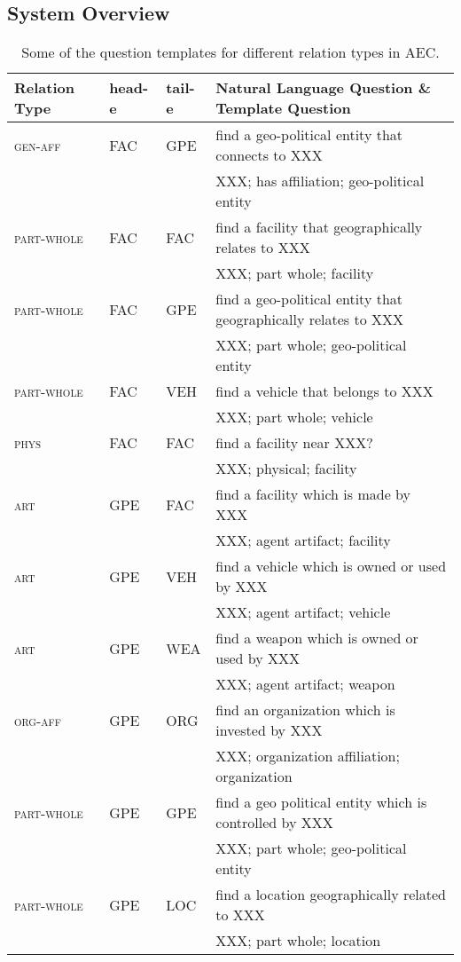 \documentclass[11pt,a4paper]{article}
\begin{document}
\subsection{System Overview}

\begin{table*}[!ht]
\small
\center
\begin{tabular}{llll}\hline
Relation Type &head-e & tail-e&Natural Language Question \& Template Question  \\\hline
\textsc{gen-aff} & FAC & GPE& find  a  geo-political  entity that connects  to  XXX   \\
& & & XXX; has affiliation; geo-political entity \\\hline
\textsc{part-whole}& FAC& FAC& find  a  facility  that geographically  relates  to  XXX\\
& & & XXX; part whole; facility \\\hline 
\textsc{part-whole}& FAC& GPE&find  a  geo-political  entity  that geographically  relates  to  XXX  \\
& & & XXX; part whole; geo-political entity \\\hline 
\textsc{part-whole}& FAC & VEH & find  a  vehicle  that belongs  to  XXX   \\
& & & XXX; part whole; vehicle \\\hline 
\textsc{phys}&FAC & FAC &find  a  facility  near  XXX?    \\
& & & XXX; physical; facility \\\hline 
\textsc{art}&GPE & FAC& find  a  facility  which  is  made  by  XXX\\
& & & XXX; agent artifact; facility \\\hline 
\textsc{art}&GPE & VEH& find  a  vehicle  which  is owned  or  used  by  XXX\\
& & & XXX; agent artifact; vehicle \\\hline 
\textsc{art}&GPE & WEA& find  a  weapon  which  is owned  or  used  by  XXX\\
& & & XXX; agent artifact; weapon \\
\textsc{org-aff}&GPE & ORG&  find  an  organization  which  is  invested  by  XXX \\
& & & XXX; organization affiliation; organization \\\hline 
\textsc{part-whole}&GPE & GPE&   find  a  geo political  entity  which  is  controlled  by  XXX\\
& & & XXX; part whole; geo-political entity \\\hline 
\textsc{part-whole}&GPE & LOC&   find  a  location  geographically  related  to  XXX\\
& & & XXX; part whole; location \\\hline 
\hline 
\hline
\end{tabular}
\caption{Some of the question templates for different relation types in AEC. }
\label{reltemplate}
\end{table*}
\end{document}
